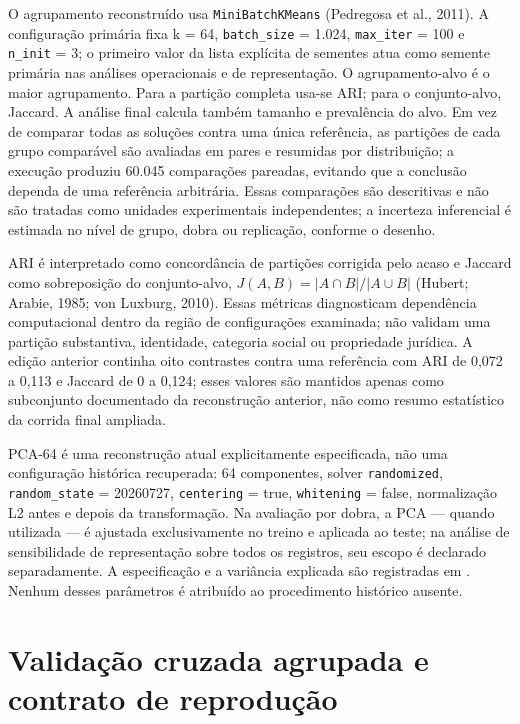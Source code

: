 O agrupamento reconstruído usa \texttt{MiniBatchKMeans} (Pedregosa et al., 2011). A configuração primária fixa k = 64, \texttt{batch\_size} = 1.024, \texttt{max\_iter} = 100 e \texttt{n\_init} = 3; o primeiro valor da lista explícita de sementes atua como semente primária nas análises operacionais e de representação. O agrupamento-alvo é o maior agrupamento. Para a partição completa usa-se ARI; para o conjunto-alvo, Jaccard. A análise final calcula também tamanho e prevalência do alvo. Em vez de comparar todas as soluções contra uma única referência, as partições de cada grupo comparável são avaliadas em pares e resumidas por distribuição; a execução produziu 60.045 comparações pareadas, evitando que a conclusão dependa de uma referência arbitrária. Essas comparações são descritivas e não são tratadas como unidades experimentais independentes; a incerteza inferencial é estimada no nível de grupo, dobra ou replicação, conforme o desenho.

ARI é interpretado como concordância de partições corrigida pelo acaso e Jaccard como sobreposição do conjunto-alvo, $J(A,B)=\lvert A\cap B\rvert/\lvert A\cup B\rvert$ (Hubert; Arabie, 1985; von Luxburg, 2010). Essas métricas diagnosticam dependência computacional dentro da região de configurações examinada; não validam uma partição substantiva, identidade, categoria social ou propriedade jurídica. A edição anterior continha oito contrastes contra uma referência com ARI de 0,072 a 0,113 e Jaccard de 0 a 0,124; esses valores são mantidos apenas como subconjunto documentado da reconstrução anterior, não como resumo estatístico da corrida final ampliada.

PCA-64 é uma reconstrução atual explicitamente especificada, não uma configuração histórica recuperada: 64 componentes, solver \texttt{randomized}, \texttt{random\_state} = 20260727, \texttt{centering} = true, \texttt{whitening} = false, normalização L2 antes e depois da transformação. Na avaliação por dobra, a PCA --- quando utilizada --- é ajustada exclusivamente no treino e aplicada ao teste; na análise de sensibilidade de representação sobre todos os registros, seu escopo é declarado separadamente. A especificação e a variância explicada são registradas em . Nenhum desses parâmetros é atribuído ao procedimento histórico ausente.

\section{Validação cruzada agrupada e contrato de reprodução}

